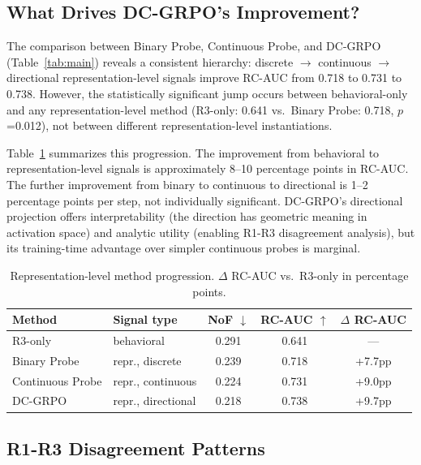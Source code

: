 \documentclass[11pt,a4paper]{article}
\begin{document}
\subsection{What Drives DC-GRPO's Improvement?}

The comparison between Binary Probe, Continuous Probe, and DC-GRPO (Table~\ref{tab:main}) reveals a consistent hierarchy: discrete $\to$ continuous $\to$ directional representation-level signals improve RC-AUC from 0.718 to 0.731 to 0.738. However, the statistically significant jump occurs between behavioral-only and any representation-level method (R3-only: 0.641 vs.\ Binary Probe: 0.718, $p$=0.012), not between different representation-level instantiations.

Table~\ref{tab:repr_comparison} summarizes this progression. The improvement from behavioral to representation-level signals is approximately 8--10 percentage points in RC-AUC. The further improvement from binary to continuous to directional is 1--2 percentage points per step, not individually significant. DC-GRPO's directional projection offers interpretability (the direction has geometric meaning in activation space) and analytic utility (enabling R1-R3 disagreement analysis), but its training-time advantage over simpler continuous probes is marginal.

\begin{table}[t]
\centering
\caption{Representation-level method progression. $\Delta$ RC-AUC vs.\ R3-only in percentage points.}
\label{tab:repr_comparison}
\small
\begin{tabular}{llccc}
\toprule
Method & Signal type & NoF $\downarrow$ & RC-AUC $\uparrow$ & $\Delta$ RC-AUC \\
\midrule
R3-only          & behavioral         & 0.291 & 0.641 & --- \\
Binary Probe     & repr., discrete    & 0.239 & 0.718 & +7.7pp \\
Continuous Probe & repr., continuous  & 0.224 & 0.731 & +9.0pp \\
DC-GRPO          & repr., directional & 0.218 & 0.738 & +9.7pp \\
\bottomrule
\end{tabular}
\end{table}

\subsection{R1-R3 Disagreement Patterns}
\label{sec:disagreement}
\end{document}
